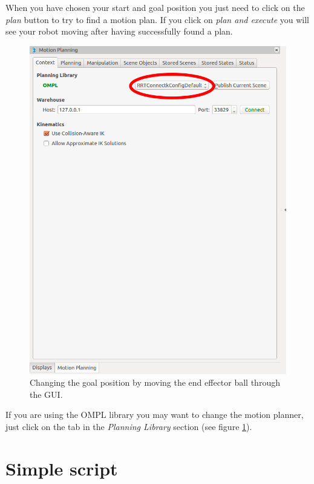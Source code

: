 When you have chosen your start and goal position you just need to click on the \emph{plan} button to try to find a motion plan. If you click on \emph{plan and execute} you will see your robot moving after having successfully found a plan.


\begin{figure}[h]
\includegraphics[scale=0.19]{images/motion_planning/gui_change_planner.png}
\centering
\caption{Changing the goal position by moving the end effector ball through the GUI.}
\label{fig:gui_change_planner}
\end{figure}

If you are using the OMPL library you may want to change the motion planner, just click on the tab in the \emph{Planning Library} section (see figure \ref{fig:gui_change_planner}).

\section{Simple script}

